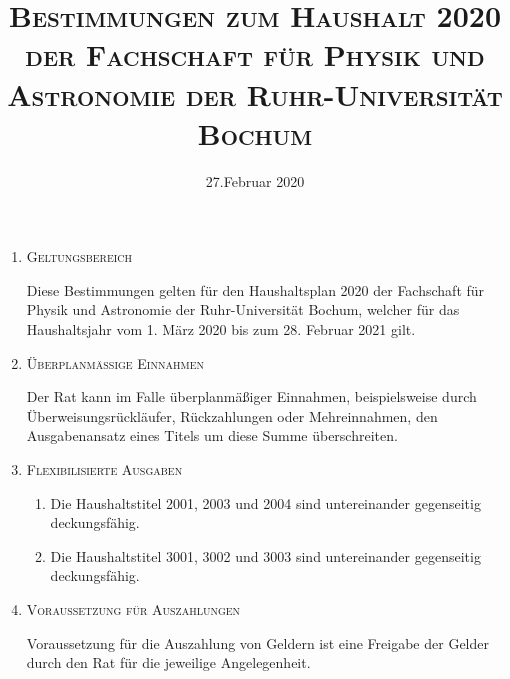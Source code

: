 \documentclass[a4paper, 12pt]{article}
\title{\textsc{Bestimmungen zum Haushalt 2020 der Fachschaft für Physik und Astronomie der Ruhr-Universität Bochum}}
\date{27.Februar 2020}
\newcommand{\changefont}[3]{\fontfamily{#1}\fontseries{#2}\fontshape{#3}\selectfont}
\begin{document}
\renewcommand{\labelenumi}{§ \arabic{enumi}}
\renewcommand{\labelenumii}{(\arabic{enumii})}
\renewcommand{\labelenumiii}{\alph{enumiii})}

\newcommand{\cen}[1]{\vspace{0.25cm}\textsc{#1}
						\vspace{0.25cm}}
\newcommand{\cc}[1]{\vspace{0.25cm}\begin{center} \Large\bf \textsc{#1} \end{center}}

\changefont{ppl}{m}{n}

\maketitle
\thispagestyle{empty}
	
	
	\begin{enumerate}[leftmargin=0cm]
	
	\item \cen{Geltungsbereich}	
	
	Diese Bestimmungen gelten für den Haushaltsplan 2020 der Fachschaft für Physik und Astronomie der Ruhr-Universität Bochum, welcher für das Haushaltsjahr vom 1. März 2020 bis zum 28. Februar 2021 gilt.

	\item \cen{Überplanmäßige Einnahmen}
	
	Der Rat kann im Falle überplanmäßiger Einnahmen, beispielsweise durch Überweisungsrückläufer, Rückzahlungen oder Mehreinnahmen, den Ausgabenansatz eines Titels um diese Summe überschreiten.

	\item \cen{Flexibilisierte Ausgaben}
	
	\begin{enumerate}[leftmargin=0cm]
		\item Die Haushaltstitel 2001, 2003 und 2004 sind untereinander gegenseitig deckungsfähig.
		\item Die Haushaltstitel 3001, 3002 und 3003 sind untereinander gegenseitig deckungsfähig.
	\end{enumerate}

	\item \cen{Voraussetzung für Auszahlungen}

	Voraussetzung für die Auszahlung von Geldern ist eine Freigabe der Gelder durch den Rat für die jeweilige Angelegenheit.
	 
	
	\end{enumerate}
\end{document}
